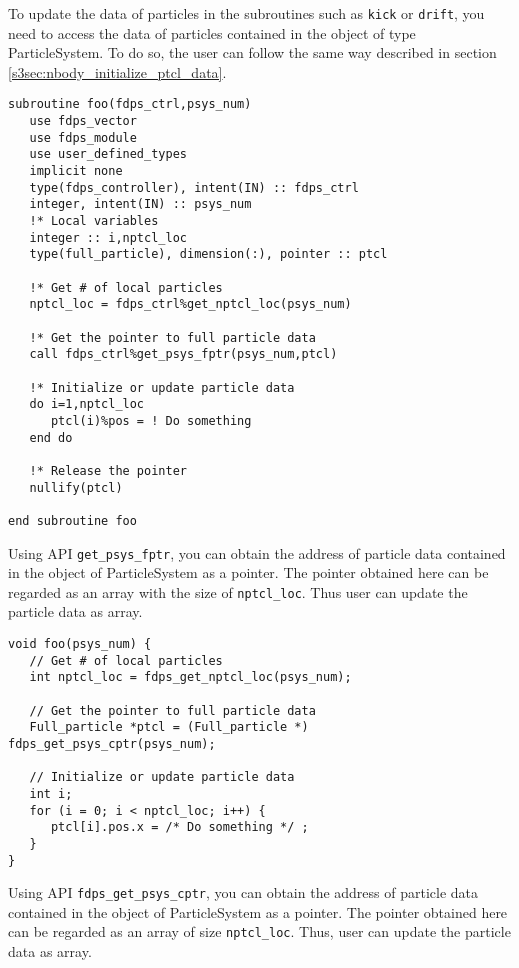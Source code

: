 \ifIF %
To update the data of particles in the subroutines such as \texttt{kick} or \texttt{drift}, you need to access the data of particles contained in the object of type \textsf{ParticleSystem}. To do so, the user can follow the same way described in section \ref{s3sec:nbody_initialize_ptcl_data}.

\ifFtn %
\begin{lstlisting}[caption=Update of particle data]
subroutine foo(fdps_ctrl,psys_num)
   use fdps_vector
   use fdps_module
   use user_defined_types
   implicit none
   type(fdps_controller), intent(IN) :: fdps_ctrl
   integer, intent(IN) :: psys_num
   !* Local variables
   integer :: i,nptcl_loc
   type(full_particle), dimension(:), pointer :: ptcl

   !* Get # of local particles
   nptcl_loc = fdps_ctrl%get_nptcl_loc(psys_num)

   !* Get the pointer to full particle data
   call fdps_ctrl%get_psys_fptr(psys_num,ptcl)
   
   !* Initialize or update particle data
   do i=1,nptcl_loc
      ptcl(i)%pos = ! Do something
   end do
   
   !* Release the pointer
   nullify(ptcl)

end subroutine foo
\end{lstlisting}
Using API \texttt{get\_psys\_fptr}, you can obtain the address of particle data contained in the object of \textsf{ParticleSystem} as a pointer. The pointer obtained here can be regarded as an array with the size of \texttt{nptcl\_loc}. Thus user can update the particle data as array.
\endifFtn
\ifC
\begin{lstlisting}[caption=Update of particle data]
void foo(psys_num) {
   // Get # of local particles
   int nptcl_loc = fdps_get_nptcl_loc(psys_num);
   
   // Get the pointer to full particle data
   Full_particle *ptcl = (Full_particle *) fdps_get_psys_cptr(psys_num);
   
   // Initialize or update particle data
   int i;
   for (i = 0; i < nptcl_loc; i++) {
      ptcl[i].pos.x = /* Do something */ ;
   }  
}
\end{lstlisting}
Using API \texttt{fdps\_get\_psys\_cptr}, you can obtain the address of particle data contained in the object of \textsf{ParticleSystem} as a pointer. The pointer obtained here can be regarded as an array of size \texttt{nptcl\_loc}. Thus, user can update the particle data as array.
\endifC
\endifIF

